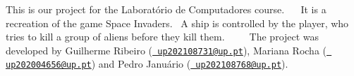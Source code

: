 This is our project for the Laboratório de Computadores course.~\newline
~\newline
It is a recreation of the game Space Invaders.~\newline
A ship is controlled by the player, who tries to kill a group of aliens before they kill them.~\newline
~\newline
~\newline
The project was developed by Guilherme Ribeiro (\href{mailto:up202108731@up.pt}{\texttt{ up202108731@up.\+pt}}), Mariana Rocha (\href{mailto:up202004656@up.pt}{\texttt{ up202004656@up.\+pt}}) and Pedro Januário (\href{mailto:up202108768@up.pt}{\texttt{ up202108768@up.\+pt}}). 